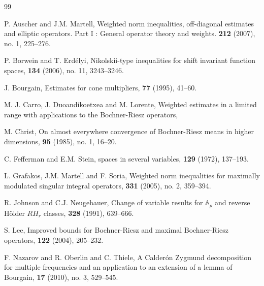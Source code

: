 \documentclass[11pt]{amsart}
\theoremstyle{remark}
\begin{document}
\begin{thebibliography}{99}

P. Auscher and J.M. Martell, 
\newblock  Weighted norm inequalities, off-diagonal estimates and elliptic operators. Part I : General operator theory and weights.
 \textbf{212} (2007), no. 1, 225--276.

P. Borwein and T. Erd\'elyi, 
\newblock Nikolskii-type inequalities for shift invariant function spaces, 
 \textbf{134} (2006), no. 11, 3243--3246.

J. Bourgain, 
\newblock Estimates for cone multipliers, 
 \textbf{77} (1995), 41--60.

M. J. Carro, J. Duoandikoetxea and M. Lorente,
\newblock Weighted estimates in a limited range with applications to the Bochner-Riesz operators,

M. Christ, 
\newblock On almost everywhere convergence of Bochner-Riesz means in higher dimensions, 
 \textbf{95} (1985), no. 1, 16--20.


C. Fefferman and E.M. Stein, 
 spaces in several variables, 
 \textbf{129} (1972), 137--193.

L. Grafakos, J.M. Martell and F. Soria,
\newblock  Weighted norm inequalities for maximally modulated singular integral operators,
 \textbf{331} (2005), no. 2, 359--394.


R. Johnson and C.J. Neugebauer, 
\newblock Change of variable results for ${\mathbb A}_p$ and reverse H\"older $RH_r$ classes, 
 \textbf{328} (1991), 639--666.

S. Lee,
\newblock Improved bounds for Bochner-Riesz and maximal Bochner-Riesz operators,
 \textbf{122} (2004), 205--232. 

 F. Nazarov and R. Oberlin and C. Thiele,
 \newblock  A Calder\'on Zygmund decomposition for multiple frequencies and an application to an extension of a lemma of Bourgain, 
   \textbf{17} (2010), no. 3, 529--545. 



\end{thebibliography}
\end{document}
